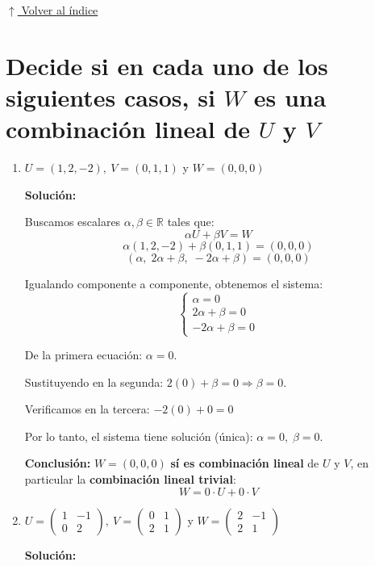 \documentclass[12pt]{article}
\newcommand{\solucion}{%
    \vspace{0.8em}%
    \textbf{Solución:}%
    \vspace{0.8em}%
}
\newcommand{\volverindice}{%
    \vspace{1em}%
    \begin{flushright}%
        \hyperlink{indice}{\small $\uparrow$ Volver al índice}%
    \end{flushright}%
}
\begin{document}
\volverindice
\newpage

\section{Decide si en cada uno de los siguientes casos, si $W$ es una combinación lineal de $U$ y $V$}

\begin{enumerate}[label=\alph*.-]
    \item $U = (1,2,-2),\ V = (0,1,1)$ y $W = (0,0,0)$

    \solucion

    Buscamos escalares $\alpha,\beta \in \mathbb{R}$ tales que:
    \[
    \alpha U + \beta V = W
    \]
    \[
    \alpha(1,2,-2)+\beta(0,1,1) = (0,0,0)
    \]
    \[
    (\alpha,\; 2\alpha+\beta,\; -2\alpha+\beta) = (0,0,0)
    \]

    Igualando componente a componente, obtenemos el sistema:
    \[
    \begin{cases}
    \alpha = 0 \\
    2\alpha+\beta = 0 \\
    -2\alpha+\beta = 0
    \end{cases}
    \]

    De la primera ecuación: $\alpha=0$.

    Sustituyendo en la segunda: $2(0)+\beta=0 \Rightarrow \beta=0$.

    Verificamos en la tercera: $-2(0)+0 = 0$ \checkmark

    Por lo tanto, el sistema tiene solución (única): $\alpha=0,\; \beta=0$.

    \textbf{Conclusión:} $W=(0,0,0)$ \textbf{sí es combinación lineal} de $U$ y $V$, en particular la \textbf{combinación lineal trivial}:
    \[
    W = 0\cdot U + 0\cdot V
    \]

    \item $U = \begin{pmatrix} 1 & -1 \\ 0 & 2 \end{pmatrix},\ V = \begin{pmatrix} 0 & 1 \\ 2 & 1 \end{pmatrix}$ y $W = \begin{pmatrix} 2 & -1 \\ 2 & 1 \end{pmatrix}$

    \solucion


\end{enumerate}
\end{document}
